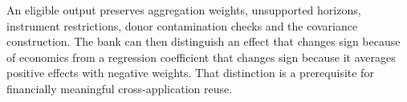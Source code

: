 An eligible output preserves aggregation weights, unsupported horizons,
instrument restrictions, donor contamination checks and the covariance
construction. The bank can then distinguish an effect that changes
sign because of economics from a regression coefficient that changes
sign because it averages positive effects with negative weights.
That distinction is a prerequisite for financially meaningful
cross-application reuse.




